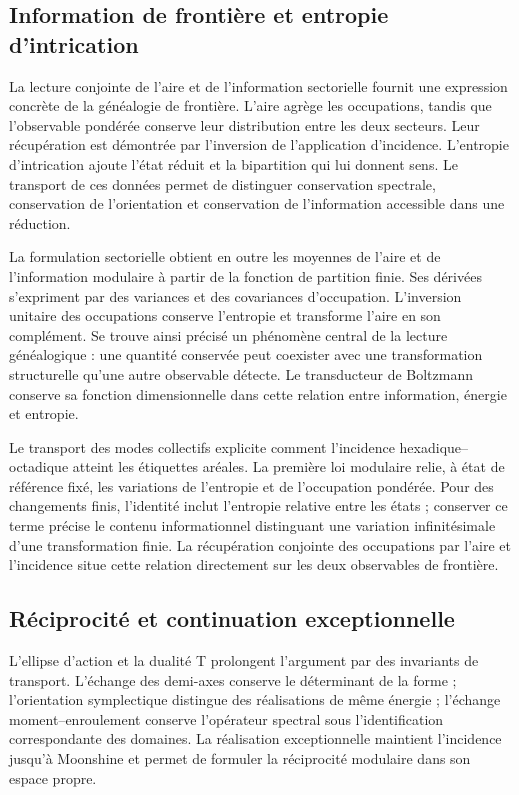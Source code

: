 \subsection{Information de frontière et entropie d'intrication}

La lecture conjointe de l'aire et de l'information sectorielle fournit une
expression concrète de la généalogie de frontière. L'aire agrège les
occupations, tandis que l'observable pondérée conserve leur distribution
entre les deux secteurs. Leur récupération est démontrée par
l'inversion de l'application d'incidence. L'entropie d'intrication ajoute
l'état réduit et la bipartition qui lui donnent sens. Le
transport de ces données permet de distinguer conservation spectrale,
conservation de l'orientation et conservation de l'information accessible
dans une réduction.

La formulation sectorielle obtient en outre les moyennes de l'aire et de
l'information modulaire à partir de la fonction de partition finie. Ses
dérivées s'expriment par des variances et des covariances d'occupation.
L'inversion unitaire des occupations conserve l'entropie et
transforme l'aire en son complément. Se trouve ainsi précisé un phénomène
central de la lecture généalogique : une quantité conservée peut
coexister avec une transformation structurelle qu'une autre observable
détecte. Le transducteur de Boltzmann conserve sa fonction dimensionnelle
dans cette relation entre information, énergie et entropie.

Le transport des modes collectifs explicite comment l'incidence
hexadique--octadique atteint les étiquettes aréales. La première loi
modulaire relie, à état de référence fixé, les variations de
l'entropie et de l'occupation pondérée. Pour des changements finis, l'identité
inclut l'entropie relative entre les états ; conserver ce terme
précise le contenu informationnel distinguant une variation
infinitésimale d'une transformation finie. La récupération conjointe
des occupations par l'aire et l'incidence situe cette relation
directement sur les deux observables de frontière.

\subsection{Réciprocité et continuation exceptionnelle}

L'ellipse d'action et la dualité T prolongent l'argument par
des invariants de transport. L'échange des demi-axes conserve le
déterminant de la forme ; l'orientation symplectique distingue des
réalisations de même énergie ; l'échange moment--enroulement
conserve l'opérateur spectral sous l'identification correspondante
des domaines. La réalisation exceptionnelle maintient l'incidence
jusqu'à Moonshine et permet de formuler la réciprocité modulaire dans son
espace propre.

